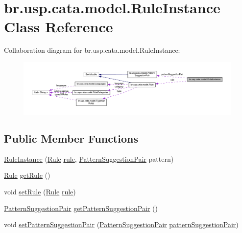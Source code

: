 \hypertarget{classbr_1_1usp_1_1cata_1_1model_1_1_rule_instance}{\section{br.\+usp.\+cata.\+model.\+Rule\+Instance Class Reference}
\label{classbr_1_1usp_1_1cata_1_1model_1_1_rule_instance}
}


Collaboration diagram for br.\+usp.\+cata.\+model.\+Rule\+Instance\+:\nopagebreak
\begin{figure}[H]
\begin{center}
\leavevmode
\includegraphics[width=350pt]{classbr_1_1usp_1_1cata_1_1model_1_1_rule_instance__coll__graph}
\end{center}
\end{figure}
\subsection*{Public Member Functions}
\begin{DoxyCompactItemize}
\item 
\hyperlink{classbr_1_1usp_1_1cata_1_1model_1_1_rule_instance_a659d0c61fe5a3e175ed4679bbb22b941}{Rule\+Instance} (\hyperlink{classbr_1_1usp_1_1cata_1_1model_1_1_rule}{Rule} \hyperlink{classbr_1_1usp_1_1cata_1_1model_1_1_rule_instance_aed7bee122f42905f2320fc01eeb3a93a}{rule}, \hyperlink{classbr_1_1usp_1_1cata_1_1model_1_1_pattern_suggestion_pair}{Pattern\+Suggestion\+Pair} pattern)
\item 
\hyperlink{classbr_1_1usp_1_1cata_1_1model_1_1_rule}{Rule} \hyperlink{classbr_1_1usp_1_1cata_1_1model_1_1_rule_instance_a327792c40f36e0600bfe65d3547772ad}{get\+Rule} ()
\item 
void \hyperlink{classbr_1_1usp_1_1cata_1_1model_1_1_rule_instance_a199920068560e7e28d1493fc668df1ec}{set\+Rule} (\hyperlink{classbr_1_1usp_1_1cata_1_1model_1_1_rule}{Rule} \hyperlink{classbr_1_1usp_1_1cata_1_1model_1_1_rule_instance_aed7bee122f42905f2320fc01eeb3a93a}{rule})
\item 
\hyperlink{classbr_1_1usp_1_1cata_1_1model_1_1_pattern_suggestion_pair}{Pattern\+Suggestion\+Pair} \hyperlink{classbr_1_1usp_1_1cata_1_1model_1_1_rule_instance_a7b5584d6960379ed061e51469a7d52c9}{get\+Pattern\+Suggestion\+Pair} ()
\item 
void \hyperlink{classbr_1_1usp_1_1cata_1_1model_1_1_rule_instance_a712c06d8a65733f448c533de92e58aaf}{set\+Pattern\+Suggestion\+Pair} (\hyperlink{classbr_1_1usp_1_1cata_1_1model_1_1_pattern_suggestion_pair}{Pattern\+Suggestion\+Pair} \hyperlink{classbr_1_1usp_1_1cata_1_1model_1_1_rule_instance_a1687392d0d1e1c5d1e7365420b4927f6}{pattern\+Suggestion\+Pair})
\end{DoxyCompactItemize}
